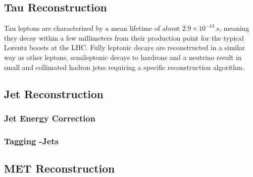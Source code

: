 \subsection{Tau Reconstruction}
\label{sec:tau_reco}

Tau leptons are characterized by a mean lifetime of about $2.9\times10^{-13}\;\text{s}$, meaning they decay within a few millimeters from their production point for the typical Lorentz boosts at the LHC. Fully leptonic decays are reconstructed in a similar way as other leptons, semileptonic decays to hardrons and a neutrino result in small and collimated hadron jetss requiring a specific reconstruction algorithm. 






\subsection{Jet Reconstruction}
\label{sec:jet_reco}


\subsubsection{Jet Energy Correction}
\label{sec:jec}
\subsubsection{Tagging \Pqb-Jets}
\label{sec:btag}

\subsection{MET Reconstruction}
\label{sec:met_reco}

